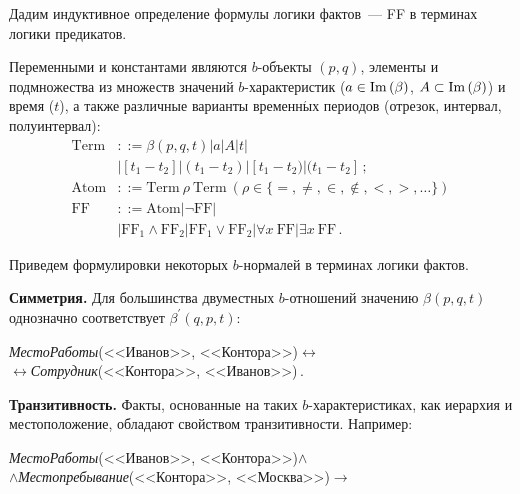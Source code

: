 \begin{multicols}{2}
  Дадим индуктивное определение формулы логики фактов~--- FF в 
терминах логики предикатов.
  
  Переменными и константами являются $b$-объ\-ек\-ты $(p, q)$, элементы и 
подмножества из множеств значений $b$-характеристик ($a\hm\in \mathrm{Im}\left(\beta\right)$, 
$A\hm\subset \mathrm{Im}\left(\beta\right)$) и время ($t$), а также различные варианты 
временн$\acute{\mbox{ы}}$х периодов (отрезок, интервал, полуинтервал):
  \begin{align*}
\mathrm{Term}&::= \beta (p, q, t) \vert a \vert  A\vert t \vert \\
& \vert [t_1 - t_2] \vert (t_1 - t_2) \vert 
[t_1 - t_2) \vert (t_1 - t_2]\,;\\
 \mathrm{Atom}&::= \mathrm{Term}\ \rho\  \mathrm{Term} \ \left(\rho\in \{=, \not=, \in, \not\in, 
 <,  >,\ldots\}\right)\\
\mathrm{FF}&::=\mathrm{Atom} \vert \neg \mathrm{FF} \vert\\
  &\vert \mathrm{FF}_1 \wedge 
  \mathrm{FF}_2\vert  \mathrm{FF}_1 \vee \mathrm{FF}_2 \vert \forall x\ 
\mathrm{FF} \vert  \exists x\ \mathrm{FF}\,.
  \end{align*}
  
  Приведем формулировки некоторых $b$-нор\-ма\-лей в терминах логики 
фактов.
  \smallskip
  
  \textbf{Симметрия.} Для большинства двуместных $b$-от\-но\-ше\-ний 
значению  
$\beta (p, q, t)$ однозначно соответствует $\beta^\prime (q, p, t)$: 

\smallskip
   
\textit{МестоРаботы}(<<Иванов>>, 
<<Контора>>)\;$\leftrightarrow$\\[-9pt]

\hspace*{10mm}$\leftrightarrow$\;\textit{Сотрудник}(<<Контора>>,  <<Иванов>>)\,.
  
  \medskip
  
  \textbf{Транзитивность.} Факты, основанные на таких\linebreak
   $b$-ха\-рак\-теристиках, 
как иерархия и местоположение, обладают свойством транзитивности. 
  \noindent
  Например: 
  
  \smallskip
  
  \noindent
  \textit{МестоРаботы}(<<Иванов>>, 
<<Контора>>)\;$\wedge$\\[-9pt]

$\wedge$\;\textit{Местопребывание}(<<Контора>>, 
<<Москва>>)\;$\rightarrow$\\[-9pt]


\end{multicols}
